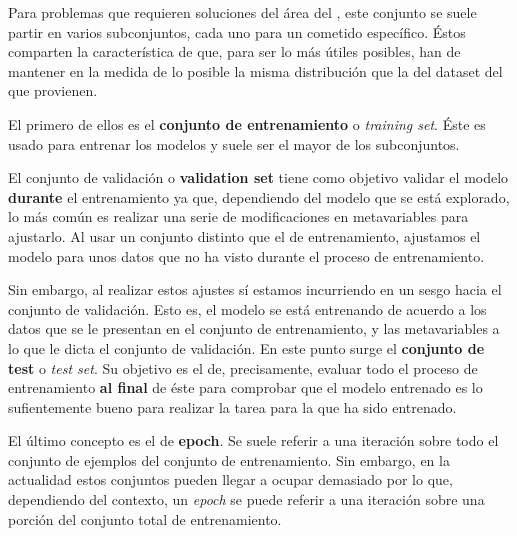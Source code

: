 Para problemas que requieren soluciones del área del , este conjunto se suele partir en varios subconjuntos, cada uno para un cometido específico. Éstos comparten la característica de que, para ser lo más útiles posibles, han de mantener en la medida de lo posible la misma distribución que la del dataset del que provienen.

El primero de ellos es el \textbf{conjunto de entrenamiento} o \textit{training set}. Éste es usado para entrenar los modelos y suele ser el mayor de los subconjuntos.

El conjunto de validación o \textbf{validation set} tiene como objetivo validar el modelo \textbf{durante} el entrenamiento ya que, dependiendo del modelo que se está explorado, lo más común es realizar una serie de modificaciones en metavariables para ajustarlo. Al usar un conjunto distinto que el de entrenamiento, ajustamos el modelo para unos datos que no ha visto durante el proceso de entrenamiento.

Sin embargo, al realizar estos ajustes sí estamos incurriendo en un sesgo hacia el conjunto de validación. Esto es, el modelo se está entrenando de acuerdo a los datos que se le presentan en el conjunto de entrenamiento, y las metavariables a lo que le dicta el conjunto de validación. En este punto surge el \textbf{conjunto de test} o \textit{test set}. Su objetivo es el de, precisamente, evaluar todo el proceso de entrenamiento \textbf{al final} de éste para comprobar que el modelo entrenado es lo sufientemente bueno para realizar la tarea para la que ha sido entrenado.

El último concepto es el de \textbf{epoch}. Se suele referir a una iteración sobre todo el conjunto de ejemplos del conjunto de entrenamiento. Sin embargo, en la actualidad estos conjuntos pueden llegar a ocupar demasiado por lo que, dependiendo del contexto, un \textit{epoch} se puede referir a una iteración sobre una porción del conjunto total de entrenamiento.

